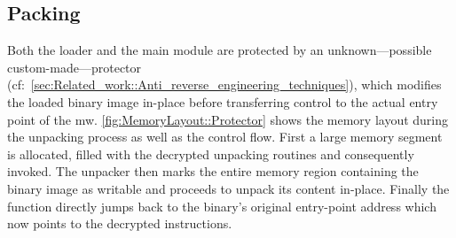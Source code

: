 \subsection{Packing\label{subsec:Reverse_engineering_Dridex::Obfuscation_measures::Packing}}
Both the loader and the main module are protected by an unknown---possible custom-made---protector (cf:~\autoref{sec:Related_work::Anti_reverse_engineering_techniques}), which modifies the loaded binary image in-place before transferring control to the actual entry point of the \gls{mw}. \autoref{fig:MemoryLayout::Protector} shows the memory layout during the unpacking process as well as the control flow.
First a large memory segment is allocated, filled with the decrypted unpacking routines and consequently invoked.
The unpacker then marks the entire memory region containing the binary image as writable and proceeds to unpack its content in-place.
Finally the function directly jumps back to the binary's original entry-point address which now points to the decrypted instructions.

